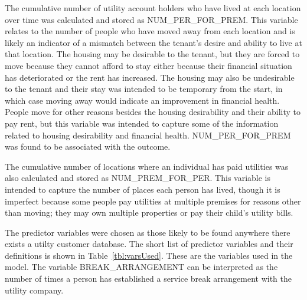 \documentclass[10pt,letterpaper]{article}
\begin{document}
The cumulative number of utility account holders who have lived at each location over time was calculated and stored as NUM\_PER\_FOR\_PREM. This variable relates to the number of people who have moved away from each location and is likely an indicator of a mismatch between the tenant's desire and ability to live at that location. The housing may be desirable to the tenant, but they are forced to move because they cannot afford to stay either because their financial situation has deteriorated or the rent has increased. The housing may also be undesirable to the tenant and their stay was intended to be temporary from the start, in which case moving away would indicate an improvement in financial health. People move for other reasons besides the housing desirability and their ability to pay rent, but this variable was intended to capture some of the information related to housing desirability and financial health. NUM\_PER\_FOR\_PREM was found to be associated with the outcome.

The cumulative number of locations where an individual has paid utilities was also calculated and stored as NUM\_PREM\_FOR\_PER. This variable is intended to capture the number of places each person has lived, though it is imperfect because some people pay utilities at multiple premises for reasons other than moving; they may own multiple properties or pay their child's utility bills.

The predictor variables were chosen as those likely to be found anywhere there exists a utilty customer database. The short list of predictor variables and their definitions is shown in Table~\ref{tbl:varsUsed}. These are the variables used in the model. The variable BREAK\_ARRANGEMENT can be interpreted as the number of times a person has established a service break arrangement with the utility company.
\end{document}
